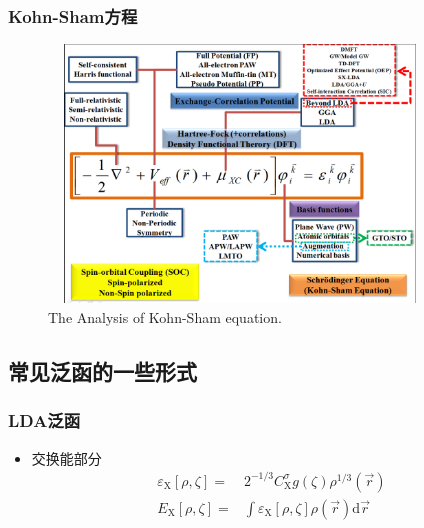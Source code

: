 \frame                               %
{
	\frametitle{\textrm{Kohn-Sham}方程}
\begin{figure}[h!]
\centering
\vspace*{-0.21in}
\hspace*{-0.1in}
\includegraphics[height=2.7in,width=4.0in,viewport=2 5 1162 880,clip]{Figures/DFT.png}
\caption{\tiny \textrm{The Analysis of Kohn-Sham equation.}}%
\label{DFT}
\end{figure}
}

\subsection{常见泛函的一些形式}
\frame%
{
	\frametitle{\rm{LDA}泛函}
	\begin{itemize}
		\item 交换能部分
	\begin{displaymath}
		\begin{aligned}
			\varepsilon_{\mathrm{X}}[\rho,\zeta]=&2^{-1/3}C_{\mathrm{X}}^{\sigma}g(\zeta)\rho^{1/3}(\vec r)\\
			E_{\mathrm{X}}[\rho,\zeta]=&\int\varepsilon_{\mathrm{X}}[\rho,\zeta]\rho(\vec r)\mathrm{d}\vec r\\
		\end{aligned}
	\end{displaymath}
	{\fontsize{7.5pt}{6.0pt}}
	\end{itemize}
}

